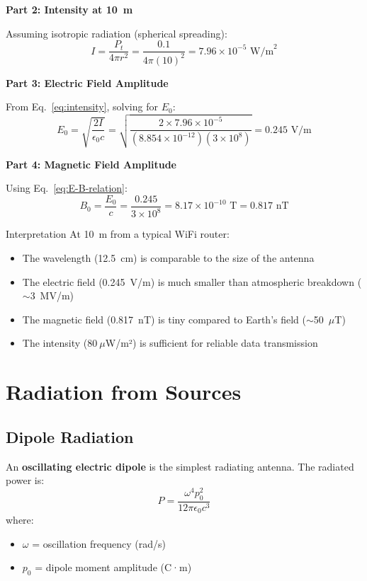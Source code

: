 \textbf{Part 2: Intensity at 10~m}

Assuming isotropic radiation (spherical spreading):
\begin{equation}
I = \frac{P_t}{4\pi r^2} = \frac{0.1}{4\pi (10)^2} = 7.96 \times 10^{-5} \text{ W/m}^2
\end{equation}

\textbf{Part 3: Electric Field Amplitude}

From Eq.~\ref{eq:intensity}, solving for $E_0$:
\begin{equation}
E_0 = \sqrt{\frac{2I}{\epsilon_0 c}} = \sqrt{\frac{2 \times 7.96 \times 10^{-5}}{(8.854 \times 10^{-12})(3 \times 10^8)}} = 0.245 \text{ V/m}
\end{equation}

\textbf{Part 4: Magnetic Field Amplitude}

Using Eq.~\ref{eq:E-B-relation}:
\begin{equation}
B_0 = \frac{E_0}{c} = \frac{0.245}{3 \times 10^8} = 8.17 \times 10^{-10} \text{ T} = 0.817 \text{ nT}
\end{equation}

\begin{calloutbox}{Interpretation}
At 10~m from a typical WiFi router:
\begin{itemize}
\item The wavelength (12.5~cm) is comparable to the size of the antenna
\item The electric field (0.245~V/m) is much smaller than atmospheric breakdown ($\sim$3~MV/m)
\item The magnetic field (0.817~nT) is tiny compared to Earth's field ($\sim$50~$\mu$T)
\item The intensity ($80~\mu$W/m²) is sufficient for reliable data transmission
\end{itemize}
\end{calloutbox}

\section{Radiation from Sources}

\subsection{Dipole Radiation}

An \textbf{oscillating electric dipole} is the simplest radiating antenna. The radiated power is:
\begin{equation}
P = \frac{\omega^4 p_0^2}{12\pi\epsilon_0 c^3}
\label{eq:dipole-power}
\end{equation}
where:
\begin{itemize}
\item $\omega$ = oscillation frequency (rad/s)
\item $p_0$ = dipole moment amplitude (C·m)
\end{itemize}

